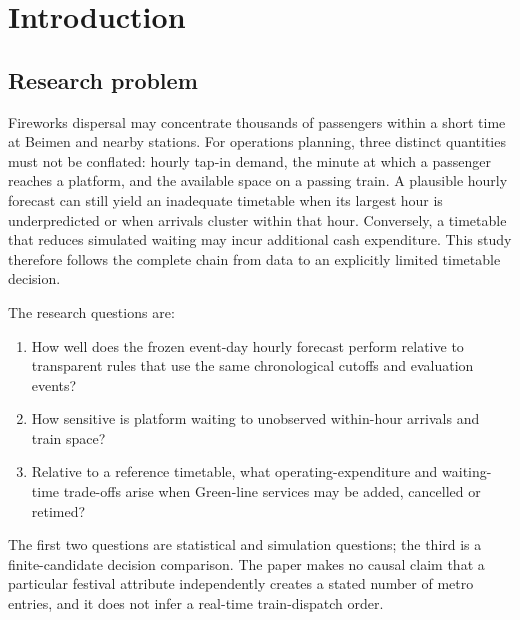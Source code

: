 \section{Introduction}
\subsection{Research problem}
Fireworks dispersal may concentrate thousands of passengers within a short time at Beimen and nearby stations. For operations planning, three distinct quantities must not be conflated: hourly tap-in demand, the minute at which a passenger reaches a platform, and the available space on a passing train. A plausible hourly forecast can still yield an inadequate timetable when its largest hour is underpredicted or when arrivals cluster within that hour. Conversely, a timetable that reduces simulated waiting may incur additional cash expenditure. This study therefore follows the complete chain from data to an explicitly limited timetable decision.

The research questions are:
\begin{enumerate}[leftmargin=2em]
\item How well does the frozen event-day hourly forecast perform relative to transparent rules that use the same chronological cutoffs and evaluation events?
\item How sensitive is platform waiting to unobserved within-hour arrivals and train space?
\item Relative to a reference timetable, what operating-expenditure and waiting-time trade-offs arise when Green-line services may be added, cancelled or retimed?
\end{enumerate}
The first two questions are statistical and simulation questions; the third is a finite-candidate decision comparison. The paper makes no causal claim that a particular festival attribute independently creates a stated number of metro entries, and it does not infer a real-time train-dispatch order.

